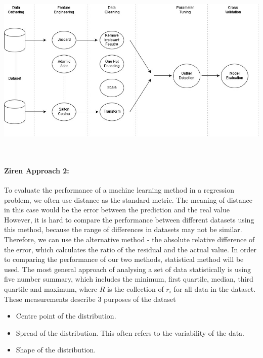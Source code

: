 \documentclass[runningheads]{llncs}
\begin{document}
\includegraphics[scale=0.4]{hld-network.jpg}\par \\

\paragraph{Ziren Approach 2:}To evaluate the performance of a machine learning method in a regression problem, we often use distance as the standard metric. The meaning of distance in this case would be the error between the prediction and the real value
However, it is hard to compare the performance between different datasets using this method, because the range of differences in datasets may not be similar. Therefore, we can use the alternative method - the absolute relative difference of the error, which calculates the ratio of the residual and the actual value. 
In order to comparing the performance of our two methods, statistical method will be used. The most general approach of analysing a set of data statistically is using five number summary, which includes the minimum, first quartile, median, third quartile and maximum,
where $R$ is the collection of $r_i$ for all data in the dataset. These measurements describe 3 purposes of the dataset
\begin{itemize}
    \item Centre point of the distribution. 
    \item Spread of the distribution. This often refers to the variability of the data. 
    \item Shape of the distribution.
\end{itemize}
\end{document}
